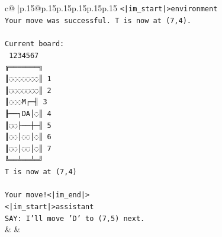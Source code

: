 \documentclass{article}
\begin{document}
{\begin{supertabular}{c@{$\;$}|p{.15\linewidth}@{}p{.15\linewidth}p{.15\linewidth}p{.15\linewidth}p{.15\linewidth}p{.15\linewidth}}
{{{\texttt{<|im\_start|>environment} \\
\texttt{Your move was successful. T is now at (7,4).} \\
\\ 
\texttt{Current board:} \\
\texttt{ 1234567} \\
\texttt{╔═══════╗} \\
\texttt{║◌◌◌◌◌◌◌║ 1} \\
\texttt{║◌◌◌◌◌◌◌║ 2} \\
\texttt{║◌◌◌M┌─╢ 3} \\
\texttt{╟──┐DA│◌║ 4} \\
\texttt{║◌◌├──┼─╢ 5} \\
\texttt{║◌◌│◌◌│◌║ 6} \\
\texttt{║◌◌│◌◌│◌║ 7} \\
\texttt{╚══╧══╧═╝} \\
\texttt{T is now at (7,4)} \\
\\ 
\texttt{Your move!<|im\_end|>} \\
\texttt{<|im\_start|>assistant} \\
\texttt{SAY: I'll move 'D' to (7,5) next.} \\
            }
        }
    }
    & & \\ \\


\end{supertabular}}
\end{document}
